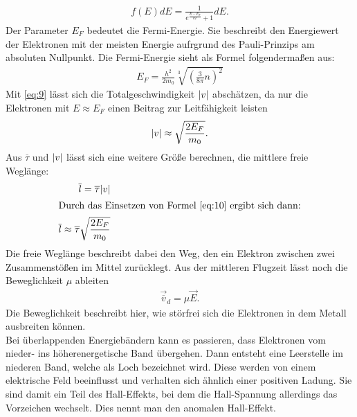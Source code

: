 \begin{align}
    f(E) dE=\frac{1}{e^{\frac{E-E_F}{kT}}+1}dE . \label{eq:8}
\end{align}
Der Parameter $E_F$ bedeutet die Fermi-Energie. Sie beschreibt den Energiewert
der Elektronen mit der meisten Energie aufrgrund des Pauli-Prinzips am absoluten
Nullpunkt. Die Fermi-Energie sieht als Formel folgendermaßen aus: \cite{V311}
\begin{align}
    E_F = \frac{h^2}{2 m_0} \sqrt[3]{\left(\frac{3}{8 \pi}n \right)^2} \label{eq:9}
\end{align}
Mit \eqref{eq:9} lässt sich die Totalgeschwindigkeit $\lvert v\rvert $ abschätzen, da nur die
Elektronen mit $E\approx E_F$ einen Beitrag zur Leitfähigkeit leisten \cite{V311}
\begin{align}
    \lvert v\rvert \approx \sqrt{\frac{2 E_F}{m_0}}. \label{eq:10}
\end{align}
Aus $\overline{\tau}$ und $\lvert v\rvert $ lässt sich eine weitere Größe berechnen, die mittlere
freie Weglänge: \cite{V311}
\begin{align}
    \overline{l} = \overline{\tau} \lvert v\rvert \label{eq:11} \\
    \intertext{Durch das Einsetzen von Formel \eqref{eq:10} ergibt sich dann:}
    \overline{l} \approx \overline{\tau} \sqrt{\frac{2 E_F}{m_0}} \label{eq:12}
\end{align}
Die freie Weglänge beschreibt dabei den Weg, den ein Elektron zwischen zwei Zusammenstößen
im Mittel zurücklegt.
Aus der mittleren Flugzeit lässt noch die Beweglichkeit $\mu$ ableiten \cite{V311}
\begin{align}
    \vec{\overline{v}} _d = \mu \vec{E} \label{eq:13}.
\end{align}
Die Beweglichkeit beschreibt hier, wie störfrei sich die Elektronen in dem Metall 
ausbreiten können.\\
Bei überlappenden Energiebändern kann es passieren, dass Elektronen vom nieder- ins höherenergetische
Band übergehen. Dann entsteht eine Leerstelle im niederen Band, welche als Loch bezeichnet wird.
Diese werden von einem elektrische Feld beeinflusst und verhalten sich ähnlich einer positiven Ladung.
Sie sind damit ein Teil des Hall-Effekts, bei dem die Hall-Spannung allerdings das 
Vorzeichen wechselt. Dies nennt man den anomalen Hall-Effekt.


